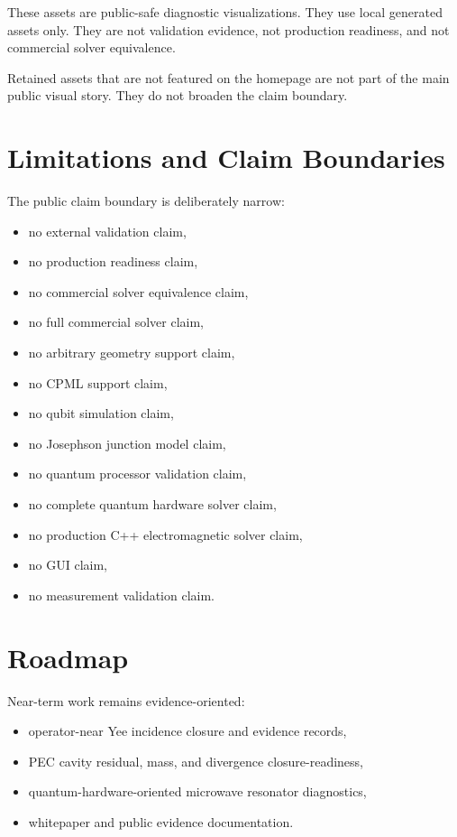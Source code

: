 \documentclass[11pt,a4paper]{article}
\begin{document}
These assets are public-safe diagnostic visualizations. They use local generated assets only. They are not validation evidence, not production readiness, and not commercial solver equivalence.

Retained assets that are not featured on the homepage are not part of the main public visual story. They do not broaden the claim boundary.

\section{Limitations and Claim Boundaries}

The public claim boundary is deliberately narrow:

\begin{itemize}
  \item no external validation claim,
  \item no production readiness claim,
  \item no commercial solver equivalence claim,
  \item no full commercial solver claim,
  \item no arbitrary geometry support claim,
  \item no CPML support claim,
  \item no qubit simulation claim,
  \item no Josephson junction model claim,
  \item no quantum processor validation claim,
  \item no complete quantum hardware solver claim,
  \item no production C++ electromagnetic solver claim,
  \item no GUI claim,
  \item no measurement validation claim.
\end{itemize}

\section{Roadmap}

Near-term work remains evidence-oriented:

\begin{itemize}
  \item operator-near Yee incidence closure and evidence records,
  \item PEC cavity residual, mass, and divergence closure-readiness,
  \item quantum-hardware-oriented microwave resonator diagnostics,
  \item whitepaper and public evidence documentation.
\end{itemize}
\end{document}
